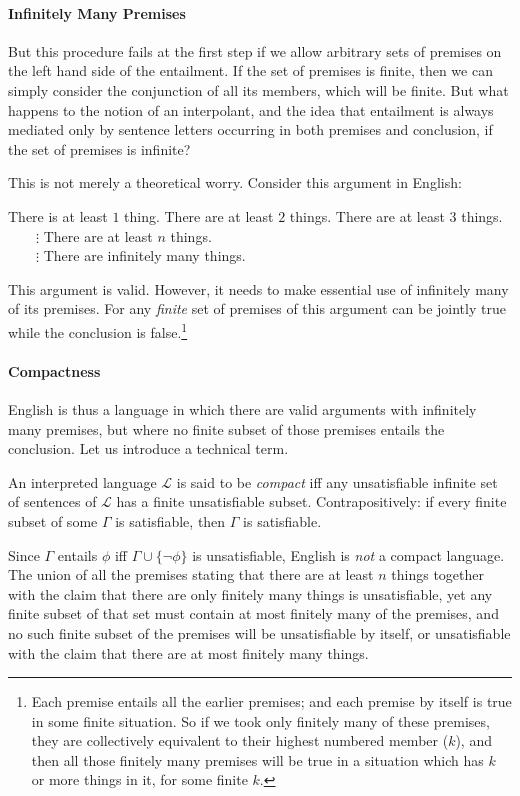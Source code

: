 \paragraph{Infinitely Many Premises} But this procedure fails at the first step if we allow arbitrary sets of premises on the left hand side of the entailment. If the set of premises is finite, then we can simply consider the conjunction of all its members, which will be finite. But what happens to the notion of an interpolant, and the idea that entailment is always mediated only by sentence letters occurring in both premises and conclusion, if the set of premises is infinite?

This is not merely a theoretical worry. Consider this argument in English: \begin{exe}
	\ex There is at least $1$ thing.
	\ex There are at least $2$ things.
	\ex There are at least $3$ things.\\
	${ }\qquad\vdots$
	 There are at least $n$ things.\\
	${ }\qquad\vdots$
	 There are infinitely many things.
\end{exe} This argument is valid. However, it needs to make essential use of infinitely many of its premises. For any \emph{finite} set of premises of this argument can be jointly true while the conclusion is false.\footnote{Each premise entails all the earlier premises; and each premise by itself is true in some finite situation. So if we took only finitely many of these premises, they are collectively equivalent to their highest numbered member ($k$), and then all those finitely many premises will be true in a situation which has $k$ or more things in it, for some finite $k$.}

\paragraph{Compactness} English is thus a language in which there are valid arguments with infinitely many premises, but where no finite subset of those premises entails the conclusion. Let us introduce a technical term. 
\begin{definition}[Compactness]
	An interpreted language $\mathcal{L}$ is said to be \emph{compact} iff any unsatisfiable infinite set of sentences of $\mathcal{L}$ has a finite unsatisfiable subset. Contrapositively: if every finite subset of some $\Gamma$ is satisfiable, then $\Gamma$ is satisfiable.
\end{definition} Since $\Gamma$ entails $\phi$ iff $\Gamma \cup \{¬\phi\}$ is unsatisfiable, English is \emph{not} a compact language. The union of all the premises stating that there are at least $n$ things together with the claim that there are only finitely many things is unsatisfiable, yet any finite subset of that set must contain at most finitely many of the premises, and no such finite subset of the premises will be unsatisfiable by itself, or unsatisfiable with the claim that there are at most finitely many things.

